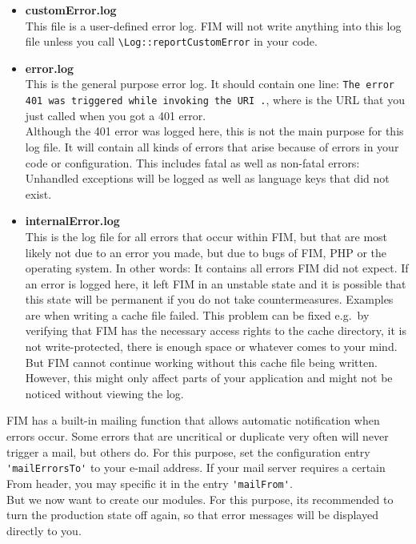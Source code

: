 \documentclass{scrartcl}
\begin{document}
      \begin{itemize}
         \item \textbf{customError.log} \\
            This file is a user-defined error log. FIM will not write anything into this log file unless you call \lstinline!\Log::reportCustomError! in your code.
         \item \textbf{error.log} \\
            This is the general purpose error log. It should contain one line: \texttt{The error 401 was triggered while invoking the URI \textvisiblespace.}, where \textvisiblespace{} is the URL that you just called when you got a 401 error. \\
            Although the 401 error was logged here, this is not the main purpose for this log file. It will contain all kinds of errors that arise because of errors in your code or configuration. This includes fatal as well as non-fatal errors: Unhandled exceptions will be logged as well as language keys that did not exist.
         \item \textbf{internalError.log} \\
            This is the log file for all errors that occur within FIM, but that are most likely not due to an error you made, but due to bugs of FIM, PHP or the operating system. In other words: It contains all errors FIM did not expect. If an error is logged here, it left FIM in an unstable state and it is possible that this state will be permanent if you do not take countermeasures. Examples are when writing a cache file failed. This problem can be fixed e.g.\ by verifying that FIM has the necessary access rights to the cache directory, it is not write-protected, there is enough space or whatever comes to your mind. But FIM cannot continue working without this cache file being written. However, this might only affect parts of your application and might not be noticed without viewing the log.
      \end{itemize}
      FIM has a built-in mailing function that allows automatic notification when errors occur. Some errors that are uncritical or duplicate very often will never trigger a mail, but others do. For this purpose, set the configuration entry \lstinline!'mailErrorsTo'! to your e-mail address. If your mail server requires a certain From header, you may specific it in the entry \lstinline!'mailFrom'!. \\
      But we now want to create our modules. For this purpose, its recommended to turn the production state off again, so that error messages will be displayed directly to you. \\
\end{document}
